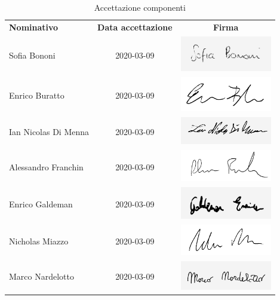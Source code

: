 \documentclass[../piano-di-progetto.tex]{subfiles}
\begin{document}
  \begin{table}[H]
    \centering
    \begin{tabular}{lcc}
      \rowcolor{lightgray}
      \textbf{Nominativo}  & \textbf{Data accettazione} & \textbf{Firma}  \\
      Sofia Bononi & 2020-03-09 & \includegraphics[width=4cm]{img/sofia-g.png} \\
      Enrico Buratto & 2020-03-09 & \includegraphics[width=4cm]{img/enricob.png}     \\
      Ian Nicolas Di Menna & 2020-03-09 & \includegraphics[width=4cm]{img/ian-g.png}     \\
      Alessandro Franchin & 2020-03-09 & \includegraphics[width=4cm]{img/ale.png}     \\
      Enrico Galdeman & 2020-03-09 & \includegraphics[width=4cm]{img/enricog-g.png}     \\
      Nicholas Miazzo & 2020-03-09 & \includegraphics[width=4cm]{img/nicholas.png}     \\
      Marco Nardelotto & 2020-03-09 & \includegraphics[width=4cm]{img/marco-g.png}
    \end{tabular}
    \caption{Accettazione componenti}
  \end{table}
\end{document}
